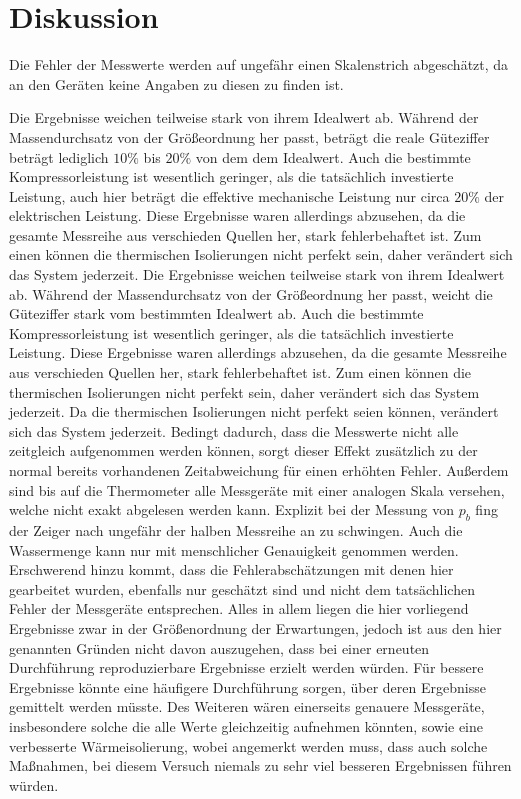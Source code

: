 \section{Diskussion}
\label{sec:Diskussion}
Die Fehler der Messwerte werden auf ungefähr einen Skalenstrich abgeschätzt, da an den Geräten keine Angaben zu diesen zu finden ist.

Die Ergebnisse weichen teilweise stark von ihrem Idealwert ab. Während der Massendurchsatz von der Größeordnung her passt, beträgt die reale Güteziffer beträgt lediglich $10 \%$ bis $20 \%$ von dem dem Idealwert.
Auch die bestimmte Kompressorleistung ist wesentlich geringer, als die tatsächlich investierte Leistung, auch hier beträgt die effektive mechanische Leistung nur circa $20 \%$ der elektrischen Leistung.
Diese Ergebnisse waren allerdings abzusehen, da die gesamte Messreihe aus verschieden Quellen her, stark fehlerbehaftet ist.
Zum einen können die thermischen Isolierungen nicht perfekt sein, daher verändert sich das System jederzeit.
Die Ergebnisse weichen teilweise stark von ihrem Idealwert ab. Während der Massendurchsatz von der Größeordnung her passt, weicht die Güteziffer stark vom bestimmten Idealwert ab.
Auch die bestimmte Kompressorleistung ist wesentlich geringer, als die tatsächlich investierte Leistung.
Diese Ergebnisse waren allerdings abzusehen, da die gesamte Messreihe aus verschieden Quellen her, stark fehlerbehaftet ist.
Zum einen können die thermischen Isolierungen nicht perfekt sein, daher verändert sich das System jederzeit.
Da die thermischen Isolierungen nicht perfekt seien können, verändert sich das System jederzeit.
Bedingt dadurch, dass die Messwerte nicht alle zeitgleich aufgenommen werden können, sorgt dieser Effekt zusätzlich zu der normal bereits vorhandenen Zeitabweichung für einen erhöhten Fehler.
Außerdem sind bis auf die Thermometer alle Messgeräte mit einer analogen Skala versehen, welche nicht exakt abgelesen werden kann. Explizit bei der Messung von $p_b$ fing der Zeiger nach ungefähr der halben Messreihe an zu schwingen.
Auch die Wassermenge kann nur mit menschlicher Genauigkeit genommen werden.
Erschwerend hinzu kommt, dass die Fehlerabschätzungen mit denen hier gearbeitet wurden, ebenfalls nur geschätzt sind und nicht dem tatsächlichen Fehler der Messgeräte entsprechen.
Alles in allem liegen die hier vorliegend Ergebnisse zwar in der Größenordnung der Erwartungen, jedoch ist aus den hier genannten Gründen nicht davon auszugehen, dass bei einer erneuten Durchführung reproduzierbare Ergebnisse erzielt werden würden.
Für bessere Ergebnisse könnte eine häufigere Durchführung sorgen, über deren Ergebnisse gemittelt werden müsste.
Des Weiteren wären einerseits genauere Messgeräte, insbesondere solche die alle Werte gleichzeitig aufnehmen könnten, sowie eine verbesserte Wärmeisolierung, 
wobei angemerkt werden muss, dass auch solche Maßnahmen, bei diesem Versuch niemals zu sehr viel besseren Ergebnissen führen würden.
